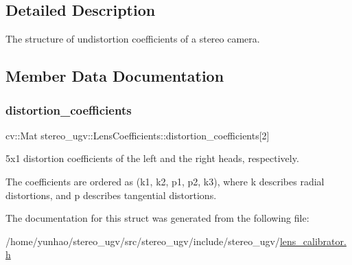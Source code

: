 \subsection{Detailed Description}
The structure of undistortion coefficients of a stereo camera. 

\subsection{Member Data Documentation}
\mbox{\label{structstereo__ugv_1_1LensCoefficients_a5fcc432a6c105509aaea4fe293a3352d}} 
\subsubsection{\texorpdfstring{distortion\+\_\+coefficients}{distortion\_coefficients}}
{\footnotesize\ttfamily cv\+::\+Mat stereo\+\_\+ugv\+::\+Lens\+Coefficients\+::distortion\+\_\+coefficients\mbox{[}2\mbox{]}}



5x1 distortion coefficients of the left and the right heads, respectively. 

The coefficients are ordered as (k1, k2, p1, p2, k3), where k describes radial distortions, and p describes tangential distortions. 

The documentation for this struct was generated from the following file\+:\begin{DoxyCompactItemize}
\item 
/home/yunhao/stereo\+\_\+ugv/src/stereo\+\_\+ugv/include/stereo\+\_\+ugv/\hyperlink{lens__calibrator_8h}{lens\+\_\+calibrator.\+h}\end{DoxyCompactItemize}
